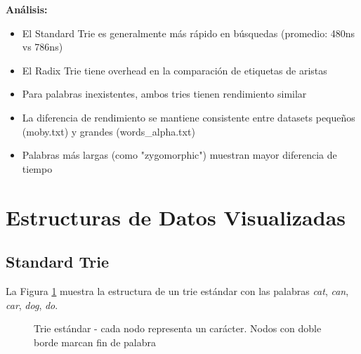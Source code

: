 \documentclass[11pt,a4paper]{article}
\begin{document}
\textbf{Análisis:}
\begin{itemize}
    \item El Standard Trie es generalmente más rápido en búsquedas (promedio: 480ns vs 786ns)
    \item El Radix Trie tiene overhead en la comparación de etiquetas de aristas
    \item Para palabras inexistentes, ambos tries tienen rendimiento similar
    \item La diferencia de rendimiento se mantiene consistente entre datasets pequeños (moby.txt) y grandes (words\_alpha.txt)
    \item Palabras más largas (como "zygomorphic") muestran mayor diferencia de tiempo
\end{itemize}

\section{Estructuras de Datos Visualizadas}

\subsection{Standard Trie}

La Figura \ref{fig:standard_trie} muestra la estructura de un trie estándar con las palabras \textit{cat}, \textit{can}, \textit{car}, \textit{dog}, \textit{do}.

\begin{figure}[H]
\centering
{}
\caption{Trie estándar - cada nodo representa un carácter. Nodos con doble borde marcan fin de palabra}
\label{fig:standard_trie}
\end{figure}
\end{document}
